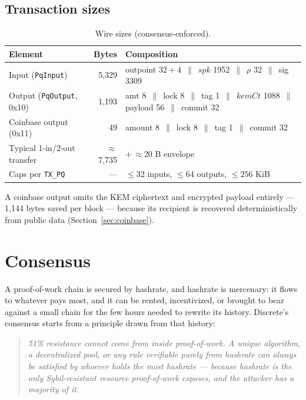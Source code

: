 \documentclass[11pt,a4paper]{article}
\newcommand{\code}[1]{\texttt{\small #1}}
\newcommand{\concat}{\,\|\,}
\begin{document}
\subsection{Transaction sizes}

\begin{table}[htbp]
\centering
\caption{Wire sizes (consensus-enforced).}
\label{tab:sizes}
\footnotesize
\begin{tabular}{@{}lrl@{}}
\toprule
\textbf{Element} & \textbf{Bytes} & \textbf{Composition} \\
\midrule
Input (\code{PqInput}) & 5{,}329 & outpoint $32{+}4$ $\concat$ $\mathit{spk}$ 1952 $\concat$ $\rho$ 32 $\concat$ sig 3309 \\
Output (\code{PqOutput}, 0x10) & 1{,}193 & amt 8 $\concat$ lock 8 $\concat$ tag 1 $\concat$ $\mathit{kemCt}$ 1088 $\concat$ payload 56 $\concat$ commit 32 \\
Coinbase output (0x11) & 49 & amount 8 $\concat$ lock 8 $\concat$ tag 1 $\concat$ commit 32 \\
Typical 1-in/2-out transfer & $\approx$ 7{,}735 & $+\,{\approx}20$ B envelope \\
Caps per \code{TX\_PQ} & --- & $\le 32$ inputs, $\le 64$ outputs, $\le 256$ KiB \\
\bottomrule
\end{tabular}
\end{table}

A coinbase output omits the KEM ciphertext and encrypted payload entirely ---
1{,}144 bytes saved per block --- because its recipient is recovered
deterministically from public data (Section~\ref{sec:coinbase}).
\section{Consensus}\label{sec:consensus}

A proof-of-work chain is secured by hashrate, and hashrate is mercenary: it
flows to whatever pays most, and it can be rented, incentivized, or brought to
bear against a small chain for the few hours needed to rewrite its history.
Discrete's consensus starts from a principle drawn from that history:

\begin{quote}\itshape
51\% resistance cannot come from inside proof-of-work. A unique algorithm, a
decentralized pool, or any rule verifiable purely from hashrate can always be
satisfied by whoever holds the most hashrate --- because hashrate is the only
Sybil-resistant resource proof-of-work exposes, and the attacker has a
majority of it.
\end{quote}
\end{document}
